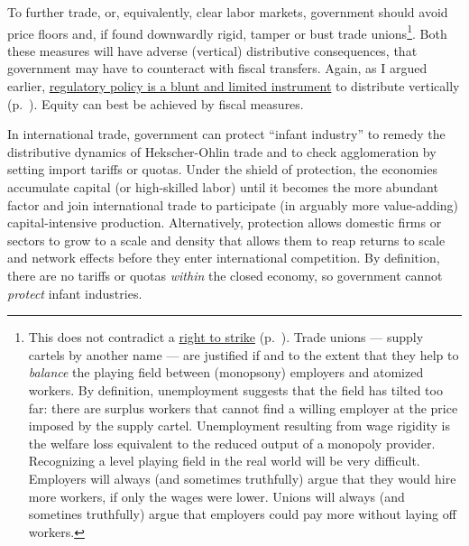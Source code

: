 To further trade, or, equivalently, clear labor markets, government should avoid price floors and, if found downwardly rigid, tamper or bust trade unions\footnote{
	This does not contradict a \hyperref[sec:redistributivepolicy]{right to strike} (p.~\pageref{sec:redistributivepolicy}). Trade unions --- supply cartels by another name --- are justified if and to the extent that they help to \emph{balance} the playing field between (monopsony) employers and atomized workers. By definition, unemployment suggests that the field has tilted too far: there are surplus workers that cannot find a willing employer at the price imposed by the supply cartel. Unemployment resulting from wage rigidity is the welfare loss equivalent to the reduced output of a monopoly provider.\\
	Recognizing a level playing field in the real world will be very difficult. Employers will always (and sometimes truthfully) argue that they would hire more workers, if only the wages were lower. Unions will always (and sometines truthfully) argue that employers could pay more without laying off workers.}.
Both these measures will have adverse (vertical) distributive consequences, that government may have to counteract with fiscal transfers. Again, as I argued earlier, \hyperref[sec:redistributivepolicy]{regulatory policy is a blunt and limited instrument} to distribute vertically (p.~\pageref{sec:redistributivepolicy}). Equity can best be achieved by fiscal measures.

In international trade, government can protect ``infant industry'' to remedy the distributive dynamics of Hekscher-Ohlin trade and to check agglomeration by setting import tariffs or quotas. Under the shield of protection, the economies accumulate capital (or high-skilled labor) until it becomes the more abundant factor and join international trade to participate (in arguably more value-adding) capital-intensive production. Alternatively, protection allows domestic firms or sectors to grow to a scale and density that allows them to reap returns to scale and network effects before they enter international competition. By definition, there are no tariffs or quotas \emph{within} the closed economy, so government cannot \emph{protect} infant industries. %

